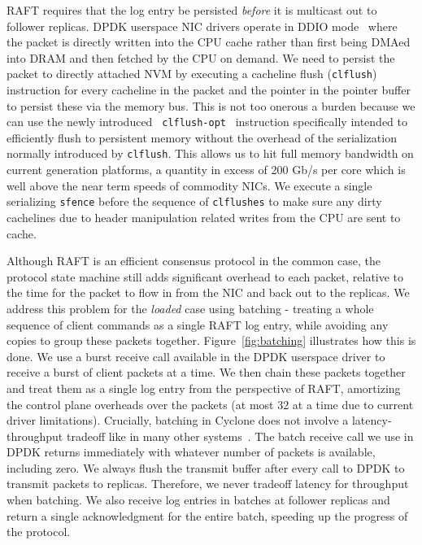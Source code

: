 \documentclass[letterpaper,twocolumn,10pt]{article}
\begin{document}
RAFT requires that the log entry be persisted \emph{before} it is multicast out
to follower replicas. DPDK userspace NIC drivers operate in DDIO
mode~\cite{ddio} where the packet is directly written into the CPU cache rather
than first being DMAed into DRAM and then fetched by the CPU on demand. We need
to persist the packet to directly attached NVM by executing a cacheline flush
({\tt clflush}) instruction for every cacheline in the packet and the pointer in
the pointer buffer to persist these via the memory bus. This is not too onerous
a burden because we can use the newly introduced {\tt
  clflush-opt}~\cite{clflush_opt} instruction specifically intended to
efficiently flush to persistent memory without the overhead of the serialization
normally introduced by {\tt clflush}. This allows us to hit full memory
bandwidth on current generation platforms, a quantity in excess of 200 Gb/s per
core which is well above the near term speeds of commodity NICs. We execute a
single serializing {\tt sfence} before the sequence of {\tt clflushes} to make
sure any dirty cachelines due to header manipulation related writes from the CPU
are sent to cache.

Although RAFT is an efficient consensus protocol in the common case, the
protocol state machine still adds significant overhead to each packet, relative
to the time for the packet to flow in from the NIC and back out to the replicas.
We address this problem for the \emph{loaded} case using batching - treating a
whole sequence of client commands as a single RAFT log entry, while avoiding any
copies to group these packets together. Figure~\ref{fig:batching} illustrates
how this is done. We use a burst receive call available in the DPDK userspace
driver to receive a burst of client packets at a time. We then chain these
packets together and treat them as a single log entry from the perspective of
RAFT, amortizing the control plane overheads over the packets (at most 32 at a
time due to current driver limitations). Crucially, batching in Cyclone does not
involve a latency-throughput tradeoff like in many other
systems~\cite{ix-dataplane}. The batch receive call we use in DPDK returns
immediately with whatever number of packets is available, including zero. We
always flush the transmit buffer after every call to DPDK to transmit packets to
replicas. Therefore, we never tradeoff latency for throughput when batching. We
also receive log entries in batches at follower replicas and return a single
acknowledgment for the entire batch, speeding up the progress of the protocol.
\end{document}
